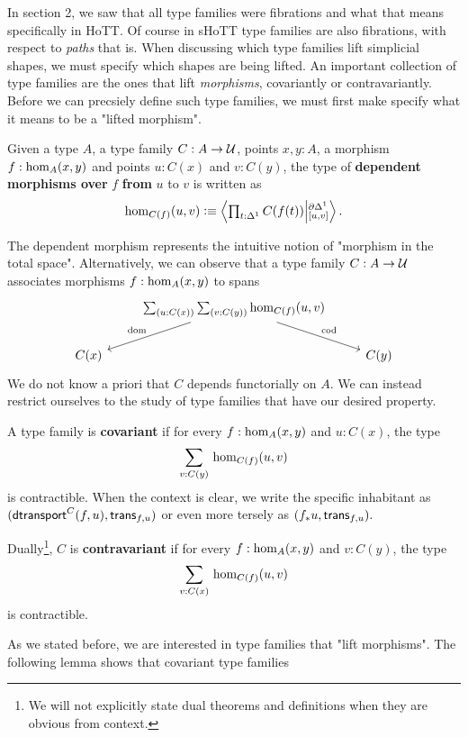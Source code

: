 \documentclass[main.tex]{subfiles}
\begin{document}
In section 2, we saw that all type families were fibrations and what that means specifically in HoTT. Of course in sHoTT type 
families are also fibrations, with respect to \textit{paths} that is. When discussing which type families lift simplicial shapes,
we must specify which shapes are being lifted. An important collection of type families are the ones that lift \textit{morphisms},
covariantly or contravariantly. Before we can precsiely define such type families, we must first make specify what it means to be a 
 "lifted morphism".
\begin{definition}
Given a type $A$, a type family $C : A \to \U$, points $x,y : A$, a morphism $f : \ho[A]{x}{y}$ and points $u : C(x)$ and $v : C(y)$, the type of \textbf{dependent morphisms over} $f$ \textbf{from} $u$ to $v$ is written as $$
\dho{C}{f}{u}{v} \defeq \exten{t : \osx}{C(f(t))}{\pardo}{[u,v]}.$$
\end{definition}
The dependent morphism represents the intuitive notion of "morphism in the total space". Alternatively, we can observe that a type family $C: A \to \U$ associates morphisms $f : \ho[A]{x}{y}$ to spans
\[\begin{tikzcd}
	& {\sm{u:C(x)}{v:C(y)}\dho{C}{f}{u}{v}} \\
	{C(x)} && {C(y)}
	\arrow["\dom"', from=1-2, to=2-1]
	\arrow["\cod", from=1-2, to=2-3]
\end{tikzcd}\]
We do not know a priori that $C$ depends functorially on $A$. We can instead restrict ourselves to the study of type families that have our
 desired property.
\begin{definition}
A type family is \textbf{covariant} if for every $f : \ho[A]{x}{y}$  and $u : C(x)$, the type $$\sm{v : C(y)} \dho{C}{f}{u}{v}$$
is contractible. When the context is clear, we write the specific inhabitant as $(\dtran{C}(f, u), \trans{f}{u})$ or 
even more tersely as $(f_*u, \trans{f}{u}).$

Dually\footnote{We will not explicitly state dual theorems and definitions when they are obvious from context.}, $C$ is \textbf{contravariant} if for every $f : \ho[A]{x}{y}$  and $v : C(y)$, the type $$\sm{v : C(x)} \dho{C}{f}{u}{v}$$
is contractible.
\end{definition}
As we stated before, we are interested in type families that "lift morphisms". The following lemma shows that covariant type families 
\end{document}
